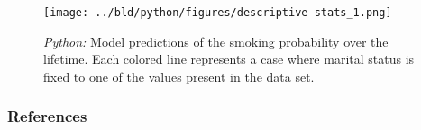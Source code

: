 \documentclass[11pt, aspectratio=169]{beamer}
\begin{document}
\begin{frame}[t]
    \begin{figure}[H]

        \centering
        \texttt{[image: ../bld/python/figures/descriptive stats\_1.png]}

        \caption{\emph{Python:} Model predictions of the smoking probability over the
            lifetime. Each colored line represents a case where marital status is fixed to
            one of the values present in the data set.}
\label{fig:python-predictions}

    \end{figure}
\end{frame}






 {
    \begin{frame}
        \frametitle{}
    \end{frame}

}

\begin{frame}[allowframebreaks]
    \frametitle{References}
    \renewcommand{\bibfont}{\normalfont\footnotesize}
    \printbibliography
\end{frame}
\end{document}
